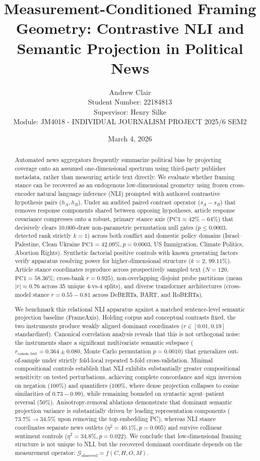 \documentclass[12pt]{article}
\title{Measurement-Conditioned Framing Geometry: Contrastive NLI and Semantic Projection in Political News}
\author{Andrew Clair \\
Student Number: 22184813 \\
Supervisor: Henry Silke \\
Module: JM4018 - INDIVIDUAL JOURNALISM PROJECT 2025/6 SEM2}
\date{March 4, 2026}
\begin{document}
\maketitle

\begin{abstract}
Automated news aggregators frequently summarize political bias by projecting coverage onto an assumed one-dimensional spectrum using third-party publisher metadata, rather than measuring article text directly. We evaluate whether framing stance can be recovered as an endogenous low-dimensional geometry using frozen cross-encoder natural language inference (NLI) prompted with authored contrastive hypothesis pairs ($h_A, h_B$). Under an audited paired contrast operator ($s_A - s_B$) that removes response components shared between opposing hypotheses, article response covariance compresses onto a robust, primary stance axis ($\mathrm{PC1} \approx 42\% - 64\%$) that decisively clears 10,000-draw non-parametric permutation null gates ($p \le 0.0003$, detected rank strictly $k=1$) across both conflict and domestic policy domains (Israel--Palestine, Clean Ukraine $\mathrm{PC1} = 42.09\%, p = 0.0003$, US Immigration, Climate Politics, Abortion Rights). Synthetic factorial positive controls with known generating factors verify apparatus resolving power for higher-dimensional structure ($k=2$, $99.11\%$). Article stance coordinates reproduce across prospectively sampled text ($N=120$, $\mathrm{PC1} = 58.36\%$; cross-bank $r = 0.925$), non-overlapping disjoint probe partitions (mean $|r| \approx 0.76$ across 35 unique 4-vs-4 splits), and diverse transformer architectures (cross-model stance $r = 0.55 - 0.81$ across DeBERTa, BART, and RoBERTa).

We benchmark this relational NLI apparatus against a matched sentence-level semantic projection baseline (FrameAxis). Holding corpus and conceptual contrasts fixed, the two instruments produce weakly aligned dominant coordinates ($r \in [0.01, 0.19]$ standardized). Canonical correlation analysis reveals that this is not orthogonal noise: the instruments share a significant multivariate semantic subspace ($r_{\mathrm{canon,test}} = 0.364 \pm 0.080$, Monte Carlo permutation $p = 0.0010$) that generalizes out-of-sample under strictly fold-local repeated 5-fold cross-validation. Minimal compositional controls establish that NLI exhibits substantially greater compositional sensitivity on tested perturbations, achieving complete concordance and sign inversion on negation ($100\%$) and quantifiers ($100\%$, where dense projection collapses to cosine similarities of $0.73 - 0.99$), while remaining bounded on syntactic agent--patient reversal ($50\%$). Anisotropy-removal ablations demonstrate that dominant semantic projection variance is substantially driven by leading representation components ($73.7\% \to 34.5\%$ upon removing the top embedding PC), whereas NLI stance coordinates separate news outlets ($\eta^2 = 40.1\%, p = 0.005$) and survive collinear sentiment controls ($\eta^2 = 34.8\%, p = 0.022$). We conclude that low-dimensional framing structure is not unique to NLI, but the recovered dominant coordinate depends on the measurement operator: $\mathcal{G}_{\text{observed}} = f(C, H, O, M)$.
\end{abstract}
\end{document}
